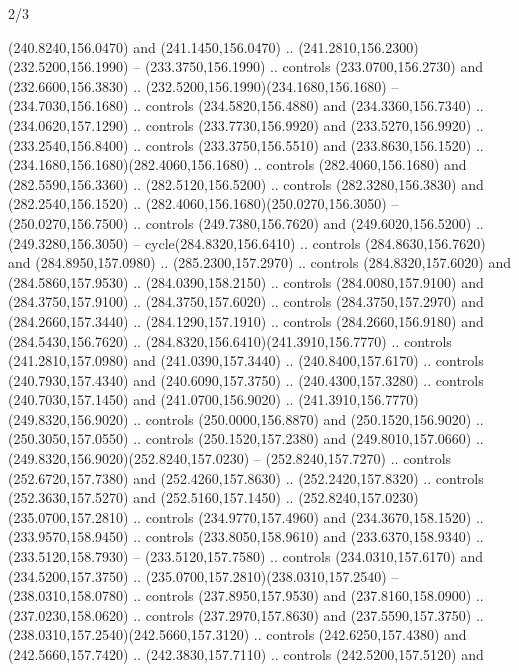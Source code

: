 \begin{flagdescription}{2/3}
\begin{scope}[xshift=0.5\flaglength,yshift=0.5\flagwidth,scale=\flagwidth/259.2]
\begin{scope}[y=0.8pt, x=0.8pt, yscale=-1,shift={(-243,-162)}]
      (240.8240,156.0470) and (241.1450,156.0470) ..
      (241.2810,156.2300)(232.5200,156.1990) -- (233.3750,156.1990) .. controls
      (233.0700,156.2730) and (232.6600,156.3830) ..
      (232.5200,156.1990)(234.1680,156.1680) -- (234.7030,156.1680) .. controls
      (234.5820,156.4880) and (234.3360,156.7340) .. (234.0620,157.1290) .. controls
      (233.7730,156.9920) and (233.5270,156.9920) .. (233.2540,156.8400) .. controls
      (233.3750,156.5510) and (233.8630,156.1520) ..
      (234.1680,156.1680)(282.4060,156.1680) .. controls (282.4060,156.1680) and
      (282.5590,156.3360) .. (282.5120,156.5200) .. controls (282.3280,156.3830) and
      (282.2540,156.1520) .. (282.4060,156.1680)(250.0270,156.3050) --
      (250.0270,156.7500) .. controls (249.7380,156.7620) and (249.6020,156.5200) ..
      (249.3280,156.3050) -- cycle(284.8320,156.6410) .. controls
      (284.8630,156.7620) and (284.8950,157.0980) .. (285.2300,157.2970) .. controls
      (284.8320,157.6020) and (284.5860,157.9530) .. (284.0390,158.2150) .. controls
      (284.0080,157.9100) and (284.3750,157.9100) .. (284.3750,157.6020) .. controls
      (284.3750,157.2970) and (284.2660,157.3440) .. (284.1290,157.1910) .. controls
      (284.2660,156.9180) and (284.5430,156.7620) ..
      (284.8320,156.6410)(241.3910,156.7770) .. controls (241.2810,157.0980) and
      (241.0390,157.3440) .. (240.8400,157.6170) .. controls (240.7930,157.4340) and
      (240.6090,157.3750) .. (240.4300,157.3280) .. controls (240.7030,157.1450) and
      (241.0700,156.9020) .. (241.3910,156.7770)(249.8320,156.9020) .. controls
      (250.0000,156.8870) and (250.1520,156.9020) .. (250.3050,157.0550) .. controls
      (250.1520,157.2380) and (249.8010,157.0660) ..
      (249.8320,156.9020)(252.8240,157.0230) -- (252.8240,157.7270) .. controls
      (252.6720,157.7380) and (252.4260,157.8630) .. (252.2420,157.8320) .. controls
      (252.3630,157.5270) and (252.5160,157.1450) ..
      (252.8240,157.0230)(235.0700,157.2810) .. controls (234.9770,157.4960) and
      (234.3670,158.1520) .. (233.9570,158.9450) .. controls (233.8050,158.9610) and
      (233.6370,158.9340) .. (233.5120,158.7930) -- (233.5120,157.7580) .. controls
      (234.0310,157.6170) and (234.5200,157.3750) ..
      (235.0700,157.2810)(238.0310,157.2540) -- (238.0310,158.0780) .. controls
      (237.8950,157.9530) and (237.8160,158.0900) .. (237.0230,158.0620) .. controls
      (237.2970,157.8630) and (237.5590,157.3750) ..
      (238.0310,157.2540)(242.5660,157.3120) .. controls (242.6250,157.4380) and
      (242.5660,157.7420) .. (242.3830,157.7110) .. controls (242.5200,157.5120) and

\end{scope}
\end{scope}
\end{flagdescription}

